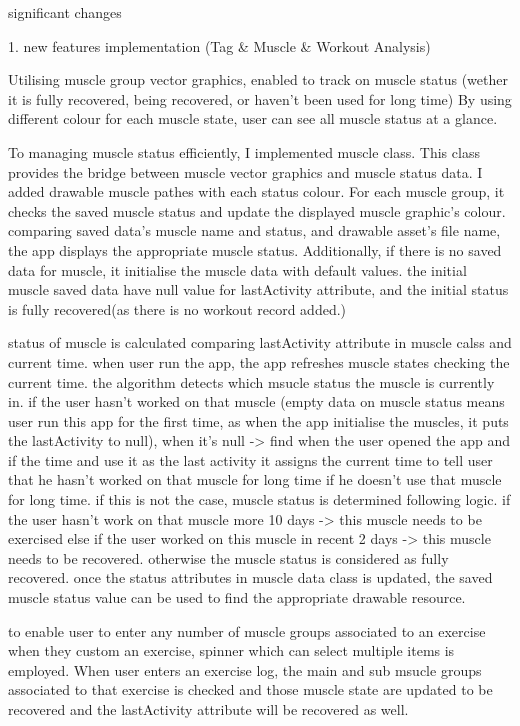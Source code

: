 
significant changes 

1. new features implementation (Tag & Muscle & Workout Analysis)


Utilising muscle group vector graphics, enabled to track on muscle status
(wether it is fully recovered, being recovered, or haven't been used for long time)
By using different colour for each muscle state, user can see all muscle status at a glance.

To managing muscle status efficiently, I implemented muscle class.
This class provides the bridge between muscle vector graphics and muscle status data.
I added drawable muscle pathes with each status colour. 
For each muscle group, it checks the saved muscle status and update the displayed muscle graphic's colour.
comparing saved data's muscle name and status, and drawable asset's file name, the app displays the appropriate muscle status.
Additionally, if there is no saved data for muscle, it initialise the muscle data with default values. 
the initial muscle saved data have null value for lastActivity attribute, and the initial status is fully recovered(as there is no workout record added.)

status of muscle is calculated comparing lastActivity attribute in muscle calss and current time.
when user run the app, the app refreshes muscle states checking the current time.
the algorithm detects which msucle status the muscle is currently in.
if the user hasn't worked on that muscle
(empty data on muscle status means user run this app for the first time, 
as when the app initialise the muscles, it puts the lastActivity to null), 
when it's null -> find when the user opened the app and if the time and use it as the last activity 
it assigns the current time to tell user that he hasn't worked on that muscle for long time if he doesn't use that muscle for long time.
if this is not the case, muscle status is determined following logic.
if the user hasn't work on that muscle more 10 days -> this muscle needs to be exercised
else if the user worked on this muscle in recent 2 days -> this muscle needs to be recovered.
otherwise the muscle status is considered as fully recovered.
once the status attributes in muscle data class is updated,
the saved muscle status value can be used to find the appropriate drawable resource.

to enable user to enter any number of muscle groups associated to an exercise when they custom an exercise,
spinner which can select multiple items is employed.
When user enters an exercise log, the main and sub msucle groups associated to that exercise is checked 
and those muscle state are updated to be recovered and the lastActivity attribute will be recovered as well.



